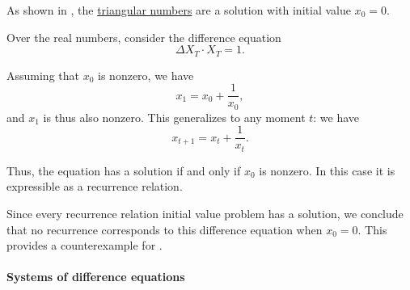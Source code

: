 \begin{example}
\begin{thmenum}
    As shown in , the \hyperref[def:triangular_number/arithmetic]{triangular numbers} are a solution with initial value \( x_0 = 0 \).

     Over the real numbers, consider the difference equation
    \begin{equation*}
      \Delta X_T \cdot X_T = 1.
    \end{equation*}

    Assuming that \( x_0 \) is nonzero, we have
    \begin{equation*}
      x_1 = x_0 + \frac 1 {x_0},
    \end{equation*}
    and \( x_1 \) is thus also nonzero. This generalizes to any moment \( t \): we have
    \begin{equation*}
      x_{t+1} = x_t + \frac 1 {x_t}.
    \end{equation*}

    Thus, the equation has a solution if and only if \( x_0 \) is nonzero. In this case it is expressible as a recurrence relation.

    Since every recurrence relation initial value problem has a solution, we conclude that no recurrence corresponds to this difference equation when \( x_0 = 0 \). This provides a counterexample for .
  \end{thmenum}
\end{example}

\paragraph{Systems of difference equations}

